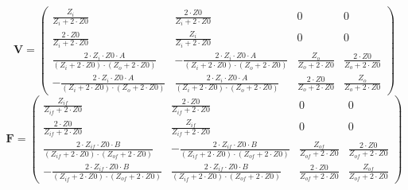 \[ \mathbf{V}=\left(\begin{smallmatrix} \frac{Z_i}{Z_i+2\cdot Z0} &
\frac{2\cdot Z0}{Z_i+2\cdot Z0} & 0 & 0 \\ \frac{2\cdot Z0}{Z_i+2\cdot
Z0} & \frac{Z_i}{Z_i+2\cdot Z0} & 0 & 0 \\ \frac{2\cdot Z_i\cdot
Z0\cdot A}{\left(Z_i+2\cdot Z0\right)\cdot\left(Z_o+2\cdot Z0\right)}
& -\frac{2\cdot Z_i\cdot Z0\cdot A}{\left(Z_i+2\cdot
Z0\right)\cdot\left(Z_o+2\cdot Z0\right)} & \frac{Z_o}{Z_o+2\cdot Z0}
& \frac{2\cdot Z0}{Z_o+2\cdot Z0} \\ -\frac{2\cdot Z_i\cdot Z0\cdot
A}{\left(Z_i+2\cdot Z0\right)\cdot\left(Z_o+2\cdot Z0\right)} &
\frac{2\cdot Z_i\cdot Z0\cdot A}{\left(Z_i+2\cdot
Z0\right)\cdot\left(Z_o+2\cdot Z0\right)} & \frac{2\cdot
Z0}{Z_o+2\cdot Z0} & \frac{Z_o}{Z_o+2\cdot Z0}
\end{smallmatrix}\right) \]
\[ \mathbf{F}=\left(\begin{smallmatrix} \frac{Z_{if}}{Z_{if}+2\cdot
Z0} & \frac{2\cdot Z0}{Z_{if}+2\cdot Z0} & 0 & 0 \\ \frac{2\cdot
Z0}{Z_{if}+2\cdot Z0} & \frac{Z_{if}}{Z_{if}+2\cdot Z0} & 0 & 0 \\
\frac{2\cdot Z_{if}\cdot Z0\cdot B}{\left(Z_{if}+2\cdot
Z0\right)\cdot\left(Z_{of}+2\cdot Z0\right)} & -\frac{2\cdot
Z_{if}\cdot Z0\cdot B}{\left(Z_{if}+2\cdot
Z0\right)\cdot\left(Z_{of}+2\cdot Z0\right)} &
\frac{Z_{of}}{Z_{of}+2\cdot Z0} & \frac{2\cdot Z0}{Z_{of}+2\cdot Z0}
\\ -\frac{2\cdot Z_{if}\cdot Z0\cdot B}{\left(Z_{if}+2\cdot
Z0\right)\cdot\left(Z_{of}+2\cdot Z0\right)} & \frac{2\cdot
Z_{if}\cdot Z0\cdot B}{\left(Z_{if}+2\cdot
Z0\right)\cdot\left(Z_{of}+2\cdot Z0\right)} & \frac{2\cdot
Z0}{Z_{of}+2\cdot Z0} & \frac{Z_{of}}{Z_{of}+2\cdot Z0}
\end{smallmatrix}\right) \]
